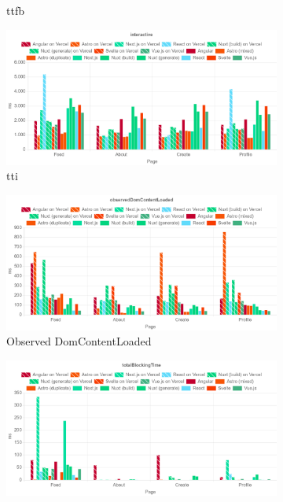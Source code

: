 \documentclass[a4paper, 12pt]{article}
\begin{document}
\begin{figure}[!h]
\begin{subfigure}{0.49\linewidth}
\begin{center}
    \end{center}
    \caption{\acrfull{ttfb}}\label{subfig:LH:timeToFirstByte}
  \end{subfigure}
  \begin{subfigure}{0.49\linewidth}
    \begin{center}
      \includegraphics[width=\linewidth, keepaspectratio]{img/lighthouse-results/TTI.png}
    \end{center}
    \caption{\acrfull{tti}}\label{subfig:LH:interactive}
  \end{subfigure}
  \begin{subfigure}{0.49\linewidth}
    \begin{center}
      \includegraphics[width=\linewidth, keepaspectratio]{img/lighthouse-results/observedDomContentLoaded.png}
    \end{center}
    \caption{Observed DomContentLoaded}\label{subfig:LH:observedDomContentLoaded}
  \end{subfigure}
  \begin{subfigure}{0.49\linewidth}
    \begin{center}
      \includegraphics[width=\linewidth, keepaspectratio]{img/lighthouse-results/TBT.png}

\end{center}
\end{subfigure}
\end{figure}
\end{document}
